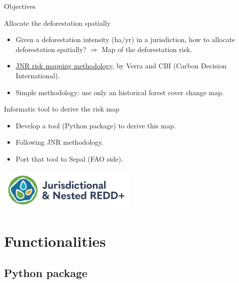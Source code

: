 \documentclass[10pt,table,dvipsnames,compress]{beamer}
\begin{document}
\begin{frame}[label={sec:orgdae1938}]{Objectives}
\begin{block}{Allocate the deforestation spatially}
\begin{itemize}
\item Given a deforestation intensity (ha/yr) in a jurisdiction, how to allocate deforestation spatially? \alert{\(\Rightarrow\) Map of the deforestation risk}.
\item \href{https://verra.org/wp-content/uploads/2021/04/DRAFT\_JNR\_Risk\_Mapping\_Tool\_15APR2021.pdf}{JNR risk mapping methodology}, by Verra and CBI (Carbon Decision International).
\item Simple methodology: use only an historical forest cover change map.
\end{itemize}
\end{block}

\begin{block}{Informatic tool to derive the risk map}
\begin{itemize}
\item Develop a tool (Python package) to derive this map.
\item Following JNR methodology.
\item Port that tool to Sepal (FAO side).
\end{itemize}

\begin{center}
\includegraphics[width=0.5\textwidth]{figs/jnr.png}
\end{center}
\end{block}
\end{frame}

\section{Functionalities}
\label{sec:orge55928d}

\subsection{Python package}
\label{sec:org5a1757e}
\end{document}
